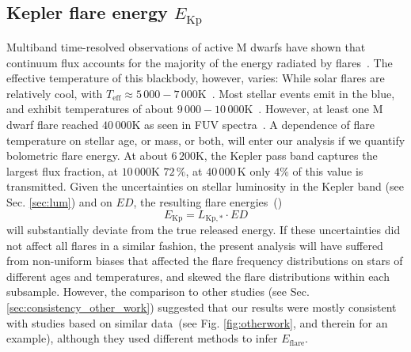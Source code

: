 \documentclass{aa}
\begin{document}
\subsection{Kepler flare energy $E_\mathrm{Kp}$}
Multiband time-resolved observations of active M dwarfs have shown that continuum flux accounts for the majority  of the energy radiated by flares~\citep{kowalski_time-resolved_2013}. %
The effective temperature of this blackbody, however, varies:
While solar flares are relatively cool, with \mbox{$T_\mathrm{eff}\approx5\,000-7\,000 $\;K}~\citep{kleint_solarstellarwlf_2016, kerr_solarstellarwlf_2014, watanabe_solarstellarwlf_2013, namekata_solarstellarwlf_2017}. Most stellar events emit in the blue, and exhibit temperatures of about $9\,000-10\,000$\;K~\citep{1992ApJS...78..565H, kretzschmar_sun_2011, davenport_multi-wavelength_2012, shibayama2013}. However, at least one M dwarf flare reached $40\,000$\;K as seen in FUV spectra~\citep{froning_40000_2019}.
A dependence of flare temperature on stellar age, or mass, or both, will enter our analysis if we quantify bolometric flare energy. At about $6\,200$\;K, the Kepler pass band captures the largest flux fraction, at $10\,000$\;K $72\,\%$, at $40\,000$\,K only $4\%$ of this value is transmitted. 
Given the uncertainties on stellar luminosity in the Kepler band (see Sec. \ref{sec:lum}) and on $ED$, the resulting flare energies~()
\begin{equation}
E_\mathrm{Kp} = L_\mathrm{Kp,*} \cdot ED
\end{equation}  
will substantially deviate from the true released energy. If these uncertainties did not affect all flares in a similar fashion, the present analysis will have suffered from non-uniform biases that affected the flare frequency distributions on stars of different ages and temperatures, and skewed the flare distributions within each subsample. However, the comparison to other studies (see Sec. \ref{sec:consistency_other_work}) suggested that our results were mostly consistent with studies based on similar data~(see Fig. \ref{fig:otherwork}, and \citealt{lin2019} therein for an example), although they used different methods to infer $E_\mathrm{flare}$.  
\end{document}
